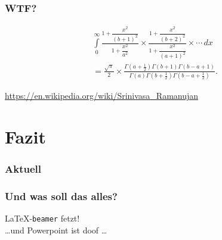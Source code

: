 \documentclass{beamer}
\begin{document}
\begin{frame}[fragile]
  \frametitle{WTF?}

  \onslide<+->

  \begin{multline*}
    \int \limits _{0}^{\infty }{\frac {1+{\dfrac {x^{2}}{(b+1)^{2}}}}{1+{\dfrac
          {x^{2}}{a^{2}}}}}\times {\frac {1+{\dfrac
          {x^{2}}{(b+2)^{2}}}}{1+{\dfrac {x^{2}}{(a+1)^{2}}}}}\times \cdots \,dx \\
    = {\frac {\sqrt {\pi }}{2}}\times {\frac {\Gamma \left(a+{\frac
            {1}{2}}\right)\Gamma (b+1)\Gamma (b-a+1)}{\Gamma (a)\Gamma
        \left(b+{\frac {1}{2}}\right)\Gamma \left(b-a+{\frac {1}{2}}\right)}}.
  \end{multline*}

  \bigskip

  {\tiny \url{https://en.wikipedia.org/wiki/Srinivasa_Ramanujan}}

  \onslide<+->


\end{frame}

\section{Fazit}

\begin{frame}
  \frametitle{Aktuell}
  \tableofcontents[currentsection]{}
\end{frame}

\begin{frame}
  \frametitle{Und was soll das alles?}

  \onslide<+->

  \begin{center}
    \LaTeX{}-\texttt{beamer} fetzt! \\
    \onslide<+->
    \dots und Powerpoint ist doof \dots
  \end{center}

\end{frame}
\end{document}
